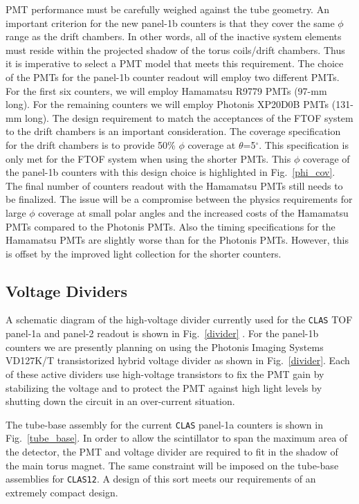 PMT performance must be carefully weighed against the tube geometry.
An important criterion for the new panel-1b counters is that they
cover the same $\phi$ range as the drift chambers.  In other words,
all of the inactive system elements must reside within the projected
shadow of the torus coils/drift chambers.  Thus it is imperative to
select a PMT model that meets this requirement.  The choice of the PMTs 
for the panel-1b counter readout will employ two different PMTs.  For 
the first six counters, we will employ Hamamatsu R9779 PMTs (97-mm long).  
For the remaining counters we will employ Photonis XP20D0B PMTs (131-mm 
long).  The design requirement to match the acceptances of the FTOF system 
to the drift chambers is an important consideration.  The coverage 
specification for the drift chambers is to provide 50\% $\phi$ coverage 
at $\theta$=5$^\circ$.  This specification is only met for the FTOF 
system when using the shorter PMTs.  This $\phi$ coverage of the panel-1b
counters with this design choice is highlighted in Fig.~\ref{phi_cov}.  The 
final number of counters readout with the Hamamatsu PMTs still needs to be 
finalized.  The issue will be a compromise between the physics requirements 
for large $\phi$ coverage at small polar angles and the increased costs
of the Hamamatsu PMTs compared to the Photonis PMTs.  Also the timing
specifications for the Hamamatsu PMTs are slightly worse than for the
Photonis PMTs.  However, this is offset by the improved light collection
for the shorter counters.

\subsection{Voltage Dividers}

A schematic diagram of the high-voltage divider currently used for the
{\tt CLAS} TOF panel-1a and panel-2 readout is shown in Fig.~\ref{divider}
\cite{smith1}.  For the panel-1b counters we are presently planning on
using the Photonis Imaging Systems VD127K/T transistorized hybrid voltage 
divider as shown in Fig.~\ref{divider}.  Each of these active dividers use 
high-voltage transistors to fix the PMT gain by stabilizing the voltage and
to protect the PMT against high light levels by shutting down the circuit 
in an over-current situation.  

The tube-base assembly for the current {\tt CLAS} panel-1a counters is shown 
in Fig.~\ref{tube_base}.  In order to allow the scintillator to span the
maximum area of the detector, the PMT and voltage divider are required to
fit in the shadow of the main torus magnet.  The same constraint will be
imposed on the tube-base assemblies for {\tt CLAS12}.  A design of this
sort meets our requirements of an extremely compact design.

